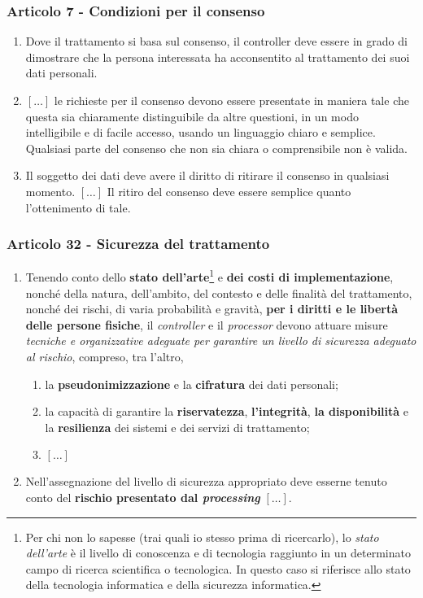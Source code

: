        \subsubsection{Articolo 7 - Condizioni per il consenso}
            \begin{enumerate}
                \item Dove il trattamento si basa sul consenso, il controller deve essere in grado di dimostrare che la persona interessata ha acconsentito al trattamento dei suoi dati personali.
                \item $\left[ \dots \right]$ le richieste per il consenso devono essere presentate in maniera tale che questa sia chiaramente distinguibile da altre questioni, in un modo intelligibile e di facile accesso, usando un linguaggio chiaro e semplice. Qualsiasi parte del consenso che non sia chiara o comprensibile non è valida.
                \item Il soggetto dei dati deve avere il diritto di ritirare il consenso in qualsiasi momento. $\left[ \dots \right]$ Il ritiro del consenso deve essere semplice quanto l'ottenimento di tale.
            \end{enumerate}
        \subsubsection{Articolo 32 - Sicurezza del trattamento}
            \begin{enumerate}
                \item Tenendo conto dello \textbf{stato dell'arte}\footnote{Per chi non lo sapesse (trai quali io stesso prima di ricercarlo), lo \textit{stato dell'arte} è il livello di conoscenza e di tecnologia raggiunto in un determinato campo di ricerca scientifica o tecnologica. In questo caso si riferisce allo stato della tecnologia informatica e della sicurezza informatica.} e \textbf{dei costi di implementazione}, nonché della natura, dell'ambito, del contesto e delle finalità del trattamento, nonché dei rischi, di varia probabilità e gravità, \textbf{per i diritti e le libertà delle persone fisiche}, il \textit{controller} e il \textit{processor} devono attuare misure \textit{tecniche e organizzative adeguate per garantire un livello di sicurezza adeguato al rischio}, compreso, tra l'altro, 
                    \begin{enumerate}
                        \item la \textbf{pseudonimizzazione} e la \textbf{cifratura} dei dati personali;
                        \item la capacità di garantire la \textbf{riservatezza}, \textbf{l'integrità}, \textbf{la disponibilità} e la \textbf{resilienza} dei sistemi e dei servizi di trattamento;
                        \item $\left[ \dots \right]$
                    \end{enumerate}
                \item Nell'assegnazione del livello di sicurezza appropriato deve esserne tenuto conto del \textbf{rischio presentato dal \textit{processing}} $ \left[ \dots \right] $.
            \end{enumerate}
